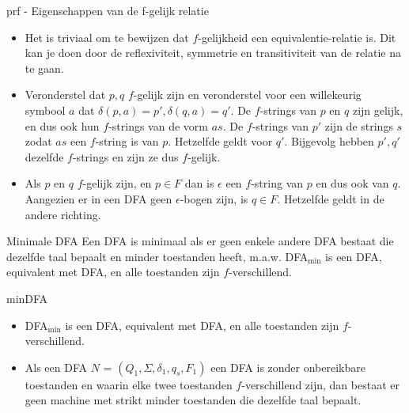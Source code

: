 \begin{prf}{prf - Eigenschappen van de f-gelijk relatie}
    \begin{itemize}
        \item Het is triviaal om te bewijzen dat $f$-gelijkheid een equivalentie-relatie is. Dit kan je doen door de reflexiviteit, symmetrie en transitiviteit van de relatie na te gaan.
        \item Veronderstel dat $p,q$ $f$-gelijk zijn en veronderstel voor een willekeurig symbool $a$ dat \(\delta(p,a) = p', \delta(q,a) = q'\). De $f$-strings van $p$ en $q$ zijn gelijk,
              en dus ook hun $f$-strings van de vorm $as$. De $f$-strings van $p'$ zijn de strings $s$ zodat $as$ een $f$-string is van $p$.
              Hetzelfde geldt voor $q'$. Bijgevolg hebben $p',q'$ dezelfde $f$-strings en zijn ze dus $f$-gelijk.
        \item Als $p$ en $q$ $f$-gelijk zijn, en $p \in F$ dan is $\epsilon$ een $f$-string van $p$ en dus ook van $q$. Aangezien er in een DFA geen $\epsilon$-bogen zijn, is $q \in F$.
              Hetzelfde geldt in de andere richting. 
    \end{itemize}
\end{prf}

\begin{theo}{Minimale DFA}
    Een DFA is minimaal als er geen enkele andere DFA bestaat die dezelfde taal bepaalt en minder toestanden heeft, m$.$a$.$w$.$ 
    DFA$_{\text{min}}$ is een DFA, equivalent met DFA, en alle toestanden zijn $f$-verschillend.
    \vspace{-0.3cm}
\end{theo}

\begin{lem}{minDFA}
    \begin{itemize}
        \item DFA$_{\text{min}}$ is een DFA, equivalent met DFA, en alle toestanden zijn $f$-verschillend.
        \item Als een DFA $N$ = $(Q_1,\Sigma, \delta_1, q_s, F_1)$  een DFA is zonder onbereikbare toestanden en waarin elke twee toestanden $f$-verschillend zijn, 
        dan bestaat er geen machine met strikt minder toestanden die dezelfde taal bepaalt.
    \end{itemize}
\end{lem}

\newpage


